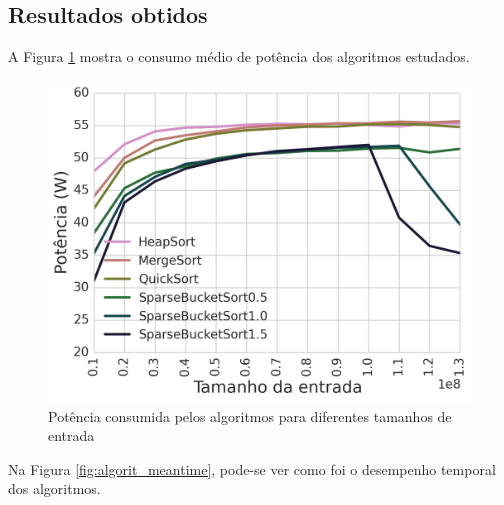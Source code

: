 \subsection{Resultados obtidos}

A Figura \ref{fig:algorit_meanpower} mostra o consumo médio de potência dos algoritmos estudados.

\begin{figure}[htp]
\centering
\includegraphics[scale=0.70]{figuras/Exper/Algorit/meanpower.png}
\caption{Potência consumida pelos algoritmos para diferentes tamanhos de entrada}
\label{fig:algorit_meanpower}
\end{figure}%

Na Figura \ref{fig:algorit_meantime}, pode-se ver como foi o desempenho temporal dos algoritmos.


